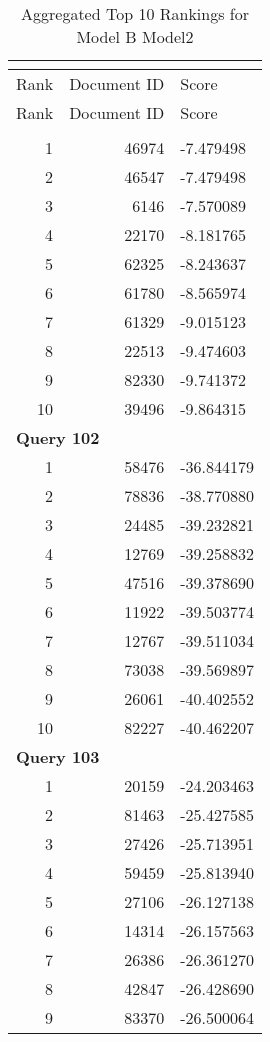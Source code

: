 \begin{longtable}[{p}]{@{}rrp{}@{}}
\caption{Aggregated Top 10 Rankings for Model B Model2} {\label{tab:aggregated_BModel2}}\\
\toprule
Rank & Document ID & Score \\
\midrule
\endfirsthead
\toprule
Rank & Document ID & Score \\
\midrule
\endhead
\endfoot
\bottomrule
\endlastfoot
\multicolumn{3}{l}{\bfseries Query 101} \\
1 & 46974 & -7.479498 \\
2 & 46547 & -7.479498 \\
3 & 6146 & -7.570089 \\
4 & 22170 & -8.181765 \\
5 & 62325 & -8.243637 \\
6 & 61780 & -8.565974 \\
7 & 61329 & -9.015123 \\
8 & 22513 & -9.474603 \\
9 & 82330 & -9.741372 \\
10 & 39496 & -9.864315 \\
\midrule
\multicolumn{3}{l}{\bfseries Query 102} \\
1 & 58476 & -36.844179 \\
2 & 78836 & -38.770880 \\
3 & 24485 & -39.232821 \\
4 & 12769 & -39.258832 \\
5 & 47516 & -39.378690 \\
6 & 11922 & -39.503774 \\
7 & 12767 & -39.511034 \\
8 & 73038 & -39.569897 \\
9 & 26061 & -40.402552 \\
10 & 82227 & -40.462207 \\
\midrule
\multicolumn{3}{l}{\bfseries Query 103} \\
1 & 20159 & -24.203463 \\
2 & 81463 & -25.427585 \\
3 & 27426 & -25.713951 \\
4 & 59459 & -25.813940 \\
5 & 27106 & -26.127138 \\
6 & 14314 & -26.157563 \\
7 & 26386 & -26.361270 \\
8 & 42847 & -26.428690 \\
9 & 83370 & -26.500064 \\

\end{longtable}
